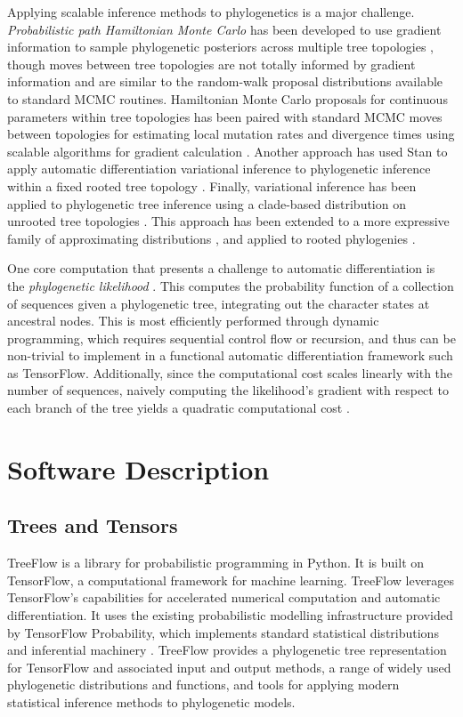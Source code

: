 Applying scalable inference methods to phylogenetics is a major challenge. \textit{Probabilistic path Hamiltonian Monte Carlo} has been developed to use gradient information to sample phylogenetic posteriors across multiple tree topologies \cite{dinh2017probabilistic}, though moves between tree topologies are not totally informed by gradient information and are similar to the random-walk proposal distributions available to standard MCMC routines. Hamiltonian Monte Carlo proposals for continuous parameters within tree topologies has been paired with standard MCMC moves between topologies for estimating local mutation rates and divergence times using scalable algorithms for gradient calculation \cite{ji2021scalable, fisher2021shrinkage}. Another approach has used Stan to apply automatic differentiation variational inference to phylogenetic inference within a fixed rooted tree topology \cite{fourment2019evaluating}. Finally, variational inference has been applied to phylogenetic tree inference using a clade-based distribution on unrooted tree topologies \cite{zhang2018variational}. This approach has been extended to a more expressive family of approximating distributions \cite{zhang2020improved}, and applied to rooted phylogenies \cite{zhang2022variational}.

One core computation that presents a challenge to automatic differentiation is the \textit{phylogenetic likelihood} \cite{felsenstein1981evolutionary}. This computes the probability function of a collection of sequences given a phylogenetic tree, integrating out the character states at ancestral nodes. This is most efficiently performed through dynamic programming, which requires sequential control flow or recursion, and thus can be non-trivial to implement in a functional automatic differentiation framework such as TensorFlow. Additionally, since the computational cost scales linearly with the number of sequences, naively computing the likelihood's gradient with respect to each branch of the tree yields a quadratic computational cost \cite{ji2020gradients}.

\section{Software Description}

\subsection{Trees and Tensors}

TreeFlow is a library for probabilistic programming in Python. It is built on TensorFlow, a computational framework for machine learning. TreeFlow leverages TensorFlow's capabilities for accelerated numerical computation and automatic differentiation. It uses the existing probabilistic modelling infrastructure provided by TensorFlow Probability, which implements standard statistical distributions and inferential machinery \cite{dillon2017tensorflow}. TreeFlow provides a phylogenetic tree representation for TensorFlow and associated input and output methods, a range of widely used phylogenetic distributions and functions, and tools for applying modern statistical inference methods to phylogenetic models.

